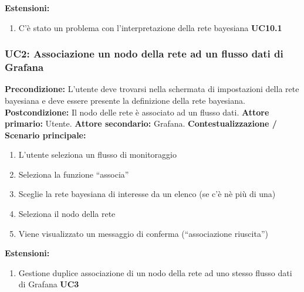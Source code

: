                     \textbf{Estensioni:} \begin{enumerate}
                            \item C’è stato un problema con l’interpretazione della rete bayesiana \textbf{UC10.1}
                        \end{enumerate}
                        
                \subsubsection{UC2: Associazione un nodo della rete ad un flusso dati di Grafana}
                    \textbf{Precondizione:}   L’utente deve trovarsi nella schermata di impostazioni della rete bayesiana e deve essere presente la definizione della rete bayesiana.
                    \newline
                    \textbf{Postcondizione:} Il nodo delle rete è associato ad un flusso dati.
                    \newline
                    \textbf{Attore primario:} Utente.
                    \newline
                    \textbf{Attore secondario:} Grafana.
                    \newline
                    \textbf{Contestualizzazione / Scenario principale:} \begin{enumerate}
                        \item L’utente seleziona un flusso di monitoraggio
                        \item Seleziona la funzione “associa”
                        \item Sceglie la rete bayesiana di interesse da un elenco (se c’è nè più di una)
                        \item Seleziona il nodo della rete
                        \item Viene visualizzato un messaggio di conferma (“associazione riuscita”)
                    \end{enumerate}
                    
                    \textbf{Estensioni:} \begin{enumerate}
                            \item Gestione duplice associazione di un nodo della rete ad uno stesso flusso dati di Grafana \textbf{UC3}
                        \end{enumerate}
                
